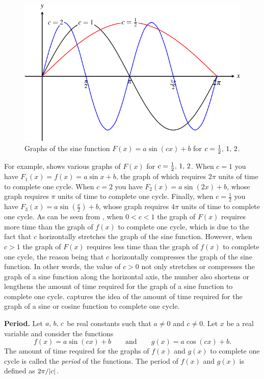 \documentclass[a4paper,oneside,12pt]{article}
\begin{document}
\begin{figure}[!htbp]
\centering
\includegraphics[scale=1.1]{image/13/sin-cycle.pdf}
\caption{%
  Graphs of the sine function $F(x) = a \sin(cx) + b$ for
  $c = {\frac{1}{2}},\, {1},\, {2}$.
}
\label{fig:trigonometric:sine_cycle}
\end{figure}

For example,  shows various
graphs of $F(x)$ for $c = {\frac{1}{2}},\, {1},\, {2}$.  When $c = 1$
you have $F_1(x) = f(x) = a \sin x + b$, the graph of which requires
$2\pi$ units of time to complete one cycle.  When $c = 2$ you have
$F_2(x) = a \sin(2x) + b$, whose graph requires $\pi$ units of time to
complete one cycle.  Finally, when $c = \frac{1}{2}$ you have
$F_3(x) = a \sin(\frac{x}{2}) + b$, whose graph requires $4\pi$ units
of time to complete one cycle.  As can be seen from
, when $0 < c < 1$ the graph of
$F(x)$ requires more time than the graph of $f(x)$ to complete one
cycle, which is due to the fact that $c$ horizontally stretches the
graph of the sine function.  However, when $c > 1$ the graph of $F(x)$
requires less time than the graph of $f(x)$ to complete one cycle, the
reason being that $c$ horizontally compresses the graph of the sine
function.  In other words, the value of $c > 0$ not only stretches or
compresses the graph of a sine function along the horizontal axis, the
number also shortens or lengthens the amount of time required for the
graph of a sine function to complete one cycle.
 captures the idea of
the amount of time required for the graph of a sine or cosine function
to complete one cycle.

\begin{definition}
\label{def:trigonometric:sine_cosine_period}
\textbf{Period.}
Let ${a},\, {b},\, {c}$ be real constants such that $a \neq 0$ and
$c \neq 0$.  Let $x$ be a real variable and consider the functions
\[
f(x)
=
a \sin(cx) + b
\qquad
\text{and}
\qquad
g(x)
=
a \cos(cx) + b.
\]
The amount of time required for the graphs of $f(x)$ and $g(x)$ to
complete one cycle is called the \emph{period} of the functions.  The
period of $f(x)$ and $g(x)$ is defined as $2\pi / \lvert c\rvert$.
\end{definition}
\end{document}
